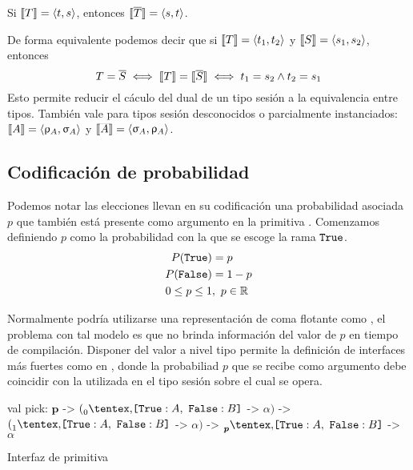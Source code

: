 \begin{theorem}
  \label{thm:duality}
  Si $\encfun\SessionType = \tsession\TypeT\TypeS$, entonces
  $\encfun{\dual\SessionType} = \tsession\TypeS\TypeT$.
\end{theorem}

De forma equivalente podemos decir que si
$\encfun\SessionTypeT = \tsession{\Type_1}{\Type_2}$ y
$\encfun\SessionTypeS = \tsession{\TypeS_1}{\TypeS_2}$, entonces
\[
\SessionTypeT = \dual\SessionTypeS
\iff
\encfun\SessionTypeT = \encfun{\dual\SessionTypeS}
\iff
\TypeT_1 = \TypeS_2
\wedge
\TypeT_2 = \TypeS_1
\]
Esto permite reducir el cáculo del dual de un tipo sesión a la
equivalencia entre tipos. También vale para tipos sesión desconocidos o parcialmente instanciados: $\encfun\etvar = \tsession{\renc\etvar}{\senc\etvar}$ y
$\encfun{\sdual\etvar} = \tsession{\senc\etvar}{\renc\etvar}$.

\subsection{Codificación de probabilidad}

Podemos notar las elecciones llevan en su codificación una probabilidad
asociada $p$ que también está presente como argumento en la primitiva
. Comenzamos definiendo $p$ como la probabilidad con la que se escoge
la rama $\Tag[True]$.
\begin{align*}
	P(\Tag[True]) &= p \\
	P(\Tag[False]) &= 1-p\\
	0 \le p \le 1 &,\ p \in \mathbb{R}
\end{align*}

Normalmente podría utilizarse una representación de coma flotante como \tfloat,
el problema con tal modelo es que no brinda información del valor de $p$ en
tiempo de compilación. Disponer del valor a nivel tipo permite la definición de
interfaces más fuertes como en , donde la probabiliad $p$ que se
recibe como argumento debe coincidir con la utilizada en el tipo sesión sobre
el cual se opera.

\begin{table}[htb]
\begin{OCamlD}[frame=single]
	val pick: $\bm{p}$ -> $(\BinaryPChoice[0]{\etvarA}{\etvarB}$ -> $\alpha)$
	            -> $(\BinaryPChoice[1]{\etvarA}{\etvarB}$ -> $\alpha)$
		    -> $\BinaryPChoice[\bm{p}]{\etvarA}{\etvarB}$ -> $\alpha$
\end{OCamlD}
\caption{Interfaz de primitiva }
\label{tab:prob_api_pick}
\end{table}

